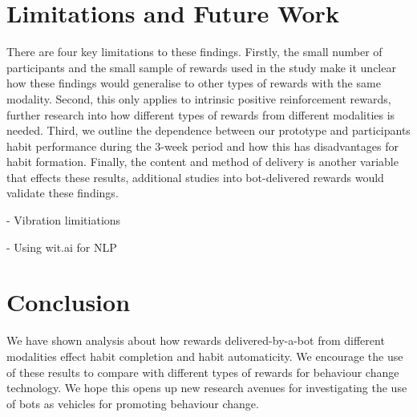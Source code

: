 
\newpage


\section{Limitations and Future Work} \label{limitations_and_future_work}
There are four key limitations to these findings. Firstly, the small number of participants and the small sample of rewards used in the study make it unclear how these findings would generalise to other types of rewards with the same modality. Second, this only applies to intrinsic positive reinforcement rewards, further research into how different types of rewards from different modalities is needed. Third, we outline the dependence between our prototype and participants habit performance during the 3-week period and how this has disadvantages for habit formation. Finally, the content and method of delivery is another variable that effects these results, additional studies into bot-delivered rewards would validate these findings.

- Vibration limitiations\newline

-  Using wit.ai for NLP


\section{Conclusion}
We have shown analysis about how rewards delivered-by-a-bot from different modalities effect habit completion and habit automaticity. We encourage the use of these results to compare with different types of rewards for behaviour change technology. We hope this opens up new research avenues for investigating the use of bots as vehicles for promoting behaviour change.


